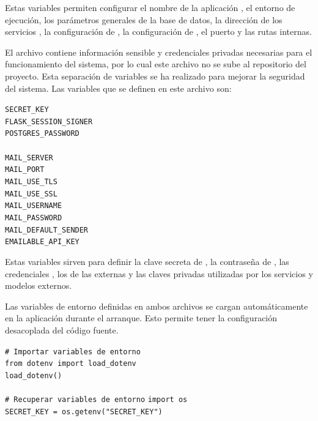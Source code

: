 Estas variables permiten configurar el nombre de la aplicación , el entorno de ejecución, los parámetros generales de la base de datos, la dirección de los servicios , la configuración de , la configuración de , el puerto y las rutas internas.

El archivo  contiene información sensible y credenciales privadas necesarias para el funcionamiento del sistema, por lo cual este archivo no se sube al repositorio  del proyecto. Esta separación de variables se ha realizado para mejorar la seguridad del sistema. Las variables que se definen en este archivo son:

\begin{tcolorbox}[
	colback=yellow!8,
	colframe=orange!60!black,
	title=secret.env,
	fonttitle=\bfseries,
	breakable
]
	{\footnotesize
		\noindent
		\texttt{SECRET\_KEY}\\
		\texttt{FLASK\_SESSION\_SIGNER}\\
		\texttt{POSTGRES\_PASSWORD}\\
		\\
		\texttt{MAIL\_SERVER}\\
		\texttt{MAIL\_PORT}\\
		\texttt{MAIL\_USE\_TLS}\\
		\texttt{MAIL\_USE\_SSL}\\
		\texttt{MAIL\_USERNAME}\\
		\texttt{MAIL\_PASSWORD}\\
		\texttt{MAIL\_DEFAULT\_SENDER}\\
		\texttt{EMAILABLE\_API\_KEY}
	}
\end{tcolorbox}

Estas variables sirven para definir la clave secreta de , la contraseña de , las credenciales , los  de las  externas y las claves privadas utilizadas por los servicios  y modelos externos.

Las variables de entorno definidas en ambos archivos se cargan automáticamente en la aplicación durante el arranque. Esto permite tener la configuración desacoplada del código fuente.

\begin{tcolorbox}[
	colback=black!3,
	colframe=black!30,
	boxrule=0.5pt,
	arc=2mm,
	title= Terminal,
	fonttitle=\bfseries,
	breakable
]
	{\footnotesize
		\noindent
		\texttt{\# Importar variables de entorno}\\
		\texttt{from dotenv import load\_dotenv}\\
		\texttt{load\_dotenv()} \\
		\\
		\texttt{\# Recuperar variables de entorno}
		\texttt{import os}\\
		\texttt{SECRET\_KEY = os.getenv("SECRET\_KEY")}
	}
\end{tcolorbox}

